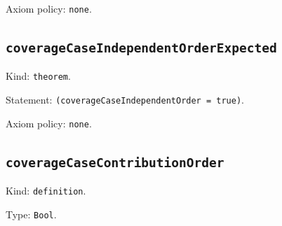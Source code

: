 \documentclass[11pt]{article}
\begin{document}
\noindent Axiom policy: \texttt{none}.\par
\subsection*{\texttt{coverageCaseIndependentOrderExpected}}
\noindent Kind: \texttt{theorem}.\par
\noindent Statement: \texttt{(coverageCaseIndependentOrder = true)}.\par
\noindent Axiom policy: \texttt{none}.\par
\subsection*{\texttt{coverageCaseContributionOrder}}
\noindent Kind: \texttt{definition}.\par
\noindent Type: \texttt{Bool}.\par
\end{document}
